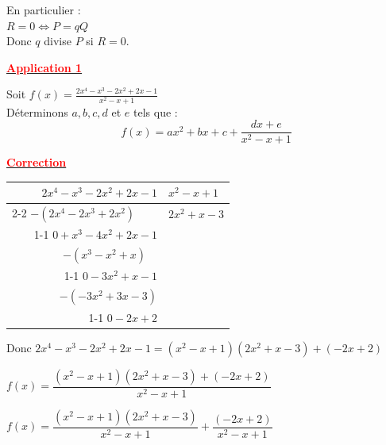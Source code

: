 \documentclass[12pt,a4paper]{article}
\begin{document}
\vspace{1em}

\noindent En particulier : \\
$R = 0 \iff P = qQ$ \\
Donc $q$ divise $P$ si $R = 0$.

\vspace{1em}

\begin{center}
    \textbf{\underline{\textcolor{red}{Application 1 }}}
\end{center}
\noindent Soit $f(x) = \frac{2x^4 - x^3 - 2x^2 + 2x - 1}{x^2 - x + 1}$ \\
Déterminons $a, b, c, d$ et $e$ tels que :
$$f(x) = ax^2 + bx + c + \frac{dx + e}{x^2 - x + 1}$$

\begin{center}
    \textbf{\underline{\textcolor{red}{Correction}}}
\end{center}

\begin{center}
\begin{tabular}{r|l}
    $2x^4 - x^3 - 2x^2 + 2x - 1$ & $x^2 - x + 1$ \\
    \cline{2-2}
    $- (2x^4 - 2x^3 + 2x^2) \quad \quad$ & $2x^2 + x - 3$ \\
    \cline{1-1}
    $0 + x^3 - 4x^2 + 2x - 1$ & \\
    $- (x^3 - x^2 + x) \quad$ & \\
    \cline{1-1}
    $0 - 3x^2 + x - 1$ & \\
    $- (-3x^2 + 3x - 3)$ & \\
    \cline{1-1}
    $0 - 2x + 2$ & 
\end{tabular}
\end{center}

\vspace{1em}

\noindent Donc $2x^4 - x^3 - 2x^2 + 2x - 1 = (x^2 - x + 1)(2x^2 + x - 3) + (-2x + 2)$

\vspace{1em}

\noindent $f(x) = \dfrac{(x^2 - x + 1)(2x^2 + x - 3) + (-2x + 2)}{x^2 - x + 1}$

\vspace{1em}

\noindent $f(x) = \dfrac{(x^2 - x + 1)(2x^2 + x - 3)}{x^2 - x + 1} + \dfrac{(-2x + 2)}{x^2 - x + 1}$

\vspace{1em}
\end{document}
